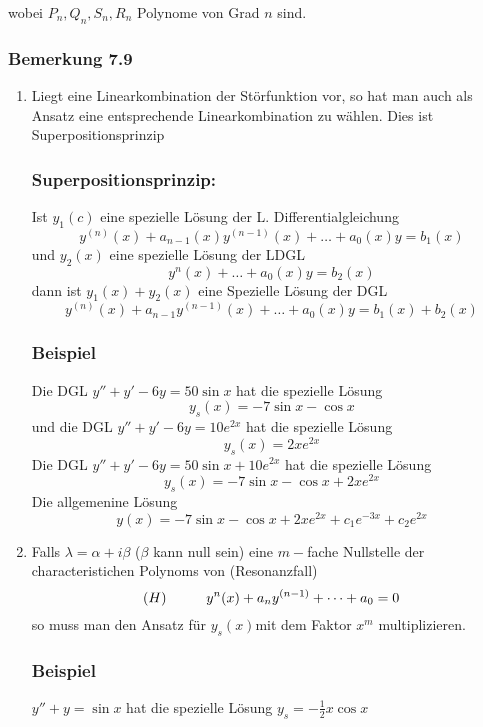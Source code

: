 wobei $P_n,Q_n,S_n,R_n$ Polynome von Grad $n$ sind.
\subsubsection*{Bemerkung 7.9}
\begin{enumerate}
\item {}Liegt eine Linearkombination der Störfunktion vor, so hat man auch als Ansatz eine entsprechende Linearkombination zu wählen. Dies ist Superpositionsprinzip
\subsubsection*{Superpositionsprinzip:}
Ist $y_1(c)$ eine spezielle Lösung der L. Differentialgleichung \[y^{(n)}(x)+a_{n-1}(x)y^{(n-1)}(x)+\dots +a_0(x)y=b_1(x)\] und $y_2(x)$ eine spezielle Lösung der LDGL \[y^n(x)+\dots +a_0(x)y=b_2(x)\] dann ist $y_1(x)+y_2(x)$ eine Spezielle Lösung der DGL \[y^{(n)}(x)+a_{n-1}y^{(n-1)}(x)+\dots+a_0(x)y=b_1(x)+b_2(x)\]
\subsubsection*{Beispiel}
Die DGL $y''+y'-6y=50\sin x$ hat die spezielle Lösung \[y_s(x)=-7\sin x-\cos x\] und die DGL $y''+y'-6y=10e^{2x}$ hat die spezielle Lösung \[y_s(x)=2xe^{2x}\]Die DGL $y''+y'-6y=50\sin x+10e^{2x}$ hat die spezielle Lösung \[y_s(x)=-7\sin x-\cos x+2xe^{2x}\] Die allgemenine Lösung \[y(x)=-7\sin x -\cos x+2xe^{2x}+c_1e^{-3x}+c_2e^{2x}\]
\item Falls $\lambda=\alpha +i\beta$ ($\beta$ kann null sein) eine $m-$fache Nullstelle der characteristichen Polynoms von (Resonanzfall) \[(H)\hspace{10mm}y^n(x)+a_ny^{(n-1)}+\dots +a_0=0\]so muss man den Ansatz für $y_s(x)$mit dem Faktor $x^m$ multiplizieren.
\subsubsection*{Beispiel}
$y''+y=\sin x$ hat die spezielle Lösung $y_s=-\frac{1}{2}x\cos x$



\begin{figure}[ht]
\begin{minipage}[b]{0.45\linewidth}
\begin{center}
\end{center}
\end{minipage}
\hspace{0.5cm}
\begin{minipage}[b]{0.45\linewidth}


\end{minipage}
\end{figure}
\end{enumerate}
